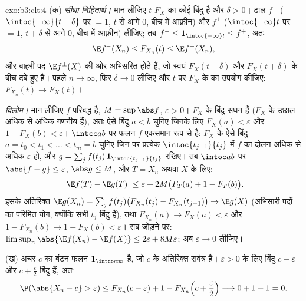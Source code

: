 \begin{solution}{exo:b3:clt:4}
(क) \emph{सीधा निहितार्थ।} मान लीजिए $t$ $F_X$ का कोई 
बिंदु है और $\delta > 0$।  ढाल
$f^-$ ($\intoc{-\infty}{t-\delta}$ पर $= 1$, $t$ से आगे $0$,
बीच में आफ़ीन) और $f^+$ ($\intoc{-\infty}t$ पर $= 1$, $t +
\delta$ से आगे $0$, बीच में आफ़ीन) लीजिए; तब $f^- \leq
\mathbf 1_{\intoc{-\infty}t} \leq f^+$, अतः
\[
\E f^-(X_n) \leq F_{X_n}(t) \leq \E f^+(X_n),
\]
और बाहरी पद $\E f^\pm(X)$ की ओर अभिसरित होते हैं, जो स्वयं
$F_X(t - \delta)$ और $F_X(t + \delta)$ के बीच दबे हुए हैं।
पहले $n \to \infty$, फिर $\delta \to 0$ लीजिए और $t$ पर
$F_X$ के  का उपयोग कीजिए: $F_{X_n}(t) \to F_X(t)$।

\emph{विलोम।} मान लीजिए $f$ परिबद्ध  है, $M =
\sup\abs f$, $\varepsilon > 0$। $F_X$ के  बिंदु सघन
हैं ($F_X$ के उछाल अधिक से अधिक गणनीय हैं), अतः ऐसे 
बिंदु $a < b$ चुनिए जिनके लिए $F_X(a) < \varepsilon$ और
$1 - F_X(b) < \varepsilon$।  $\intcc ab$ पर फलन $f$
एकसमान रूप से  है: $F_X$ के ऐसे  बिंदु
$a = t_0 < t_1 < \dots < t_m = b$ चुनिए जिन पर प्रत्येक
$\intoc{t_{j-1}}{t_j}$ में $f$ का दोलन अधिक से अधिक
$\varepsilon$ हो, और $g = \sum_j
f(t_j)\,\mathbf 1_{\intoc{t_{j-1}}{t_j}}$ रखिए। तब
$\intoc ab$ पर $\abs{f - g}
\leq \varepsilon$, $\abs g \leq M$, और $T = X_n$ अथवा $X$
के लिए:
\[
\bigl|\E f(T) - \E g(T)\bigr| \leq \varepsilon +
2M\bigl(F_T(a) + 1 - F_T(b)\bigr).
\]
इसके अतिरिक्त $\E g(X_n) = \sum_j f(t_j)\bigl(F_{X_n}(t_j) -
F_{X_n}(t_{j-1})\bigr) \to \E g(X)$ (अभिसारी पदों का परिमित
योग, क्योंकि सभी $t_j$  बिंदु हैं), तथा
$F_{X_n}(a) \to F_X(a) < \varepsilon$ और $1 - F_{X_n}(b) \to
1 - F_X(b) < \varepsilon$। सब जोड़ने पर:
$\limsup_n\abs{\E f(X_n) - \E f(X)} \leq 2\varepsilon +
8M\varepsilon$; अब $\varepsilon \to 0$ लीजिए।

(ख) अचर $c$ का बंटन फलन $\mathbf 1_{\intco c\infty}$ है, जो
$c$ के अतिरिक्त सर्वत्र  है। $\varepsilon > 0$ के लिए
बिंदु $c - \varepsilon$ और $c +
\frac\varepsilon2$  बिंदु हैं, अतः
\[
\P(\abs{X_n - c} > \varepsilon) \leq F_{X_n}(c -
\varepsilon) + 1 - F_{X_n}\Bigl(c + \frac\varepsilon2\Bigr)
\longrightarrow 0 + 1 - 1 = 0 .
\]
\end{solution}


